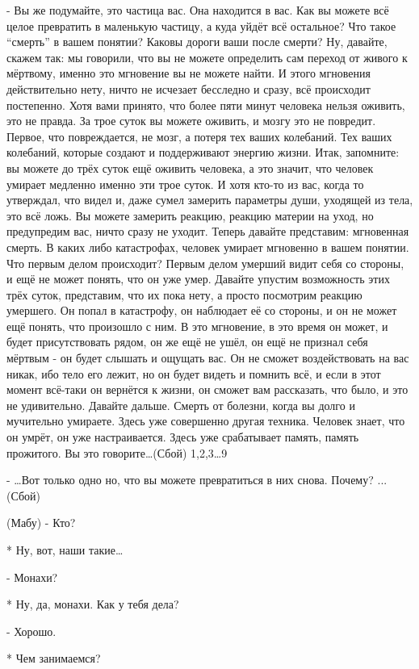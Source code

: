 -  Вы же подумайте, это частица вас. Она находится в вас. Как вы можете всё целое превратить в маленькую частицу, а куда уйдёт всё остальное? Что такое “смерть” в вашем понятии? Каковы дороги ваши после смерти? Ну, давайте, скажем так: мы говорили, что вы не можете определить сам переход от живого к мёртвому, именно это мгновение вы не можете найти. И этого мгновения действительно нету, ничто не исчезает бесследно и сразу, всё происходит постепенно. Хотя вами принято, что более пяти минут человека нельзя оживить, это не правда. За трое суток вы можете оживить, и мозгу это не повредит. Первое, что повреждается, не мозг, а потеря тех ваших колебаний. Тех ваших колебаний, которые создают и поддерживают  энергию жизни. Итак, запомните: вы можете до трёх суток ещё оживить человека, а это значит, что человек умирает медленно именно эти трое суток. И хотя кто-то из вас, когда то утверждал, что видел и, даже сумел замерить параметры души, уходящей из тела, это всё ложь. Вы можете замерить реакцию, реакцию материи на уход, но предупредим вас, ничто сразу не уходит. Теперь давайте представим: мгновенная смерть. В каких либо катастрофах, человек умирает мгновенно в вашем понятии. Что первым делом происходит? Первым делом умерший видит себя со стороны, и ещё не может понять, что он уже умер. Давайте упустим возможность этих трёх суток, представим, что их пока нету, а просто посмотрим реакцию умершего. Он попал в катастрофу, он наблюдает её со стороны, и он не может ещё понять, что произошло с ним. В это мгновение, в это время он может, и будет присутствовать рядом, он же ещё не ушёл, он ещё не признал себя мёртвым - он будет слышать и ощущать вас. Он не сможет воздействовать на вас никак, ибо тело его лежит, но он будет видеть и помнить всё, и если в этот момент  всё-таки он вернётся к жизни, он сможет вам рассказать, что было, и это не удивительно. Давайте дальше. Смерть от болезни, когда вы долго и мучительно умираете. Здесь уже совершенно другая техника. Человек знает, что он умрёт, он уже настраивается. Здесь уже срабатывает память, память прожитого. Вы это говорите…(Сбой)
1,2,3…9

- …Вот только одно но, что вы можете превратиться в них снова. Почему? ... (Сбой)

(Мабу)
- Кто?

* Ну, вот, наши такие…

- Монахи?

* Ну, да, монахи. Как у тебя дела?

- Хорошо.

* Чем занимаемся?

